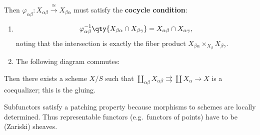 \begin{center}
\end{center}

Then
\(\varphi_{\alpha\beta}: X_{\alpha\beta}\xrightarrow{\cong} X_{\beta\alpha}\)
must satisfy the \textbf{cocycle condition}:

\begin{enumerate}
\def\labelenumi{\arabic{enumi}.}
\item

  \begin{align*}\varphi_{\alpha\beta}^{-1}\qty{ X_{\beta\alpha} \cap X_{\beta\gamma} } = X_{\alpha\beta} \cap X_{\alpha \gamma},\end{align*}
  noting that the intersection is exactly the fiber product
  \(X_{\beta\alpha} \times_{X_\beta} X_{\beta \gamma}\).
\item
  The following diagram commutes:

  \begin{center}
    \end{center}
\end{enumerate}

Then there exists a scheme \(X/S\) such that
\({\coprod}_{\alpha\beta} X_{\alpha\beta} \rightrightarrows {\coprod}X_\alpha \to X\)
is a coequalizer; this is the gluing.

Subfunctors satisfy a patching property because morphisms to schemes are
locally determined. Thus representable functors (e.g.~functors of
points) have to be (Zariski) sheaves.

